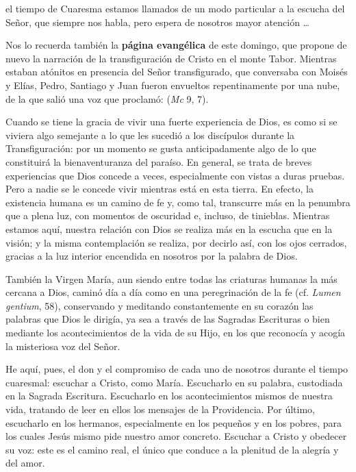 
\begin{body}
 el tiempo de Cuaresma estamos llamados de un modo particular a la escucha del Señor, que siempre nos habla, pero espera de nosotros mayor atención \ldots 

Nos lo recuerda también la \textbf{página evangélica} de este domingo, que propone de nuevo la narración de la transfiguración de Cristo en el monte Tabor. Mientras estaban atónitos en presencia del Señor transfigurado, que conversaba con Moisés y Elías, Pedro, Santiago y Juan fueron envueltos repentinamente por una nube, de la que salió una voz que proclamó:  (\textit{Mc} 9, 7). 

Cuando se tiene la gracia de vivir una fuerte experiencia de Dios, es como si se viviera algo semejante a lo que les sucedió a los discípulos durante la Transfiguración: por un momento se gusta anticipadamente algo de lo que constituirá la bienaventuranza del paraíso. En general, se trata de breves experiencias que Dios concede a veces, especialmente con vistas a duras pruebas. Pero a nadie se le concede vivir  mientras está en esta tierra. En efecto, la existencia humana es un camino de fe y, como tal, transcurre más en la penumbra que a plena luz, con momentos de oscuridad e, incluso, de tinieblas. Mientras estamos aquí, nuestra relación con Dios se realiza más en la escucha que en la visión; y la misma contemplación se realiza, por decirlo así, con los ojos cerrados, gracias a la luz interior encendida en nosotros por la palabra de Dios.

También la Virgen María, aun siendo entre todas las criaturas humanas la más cercana a Dios, caminó día a día como en una peregrinación de la fe (cf. \textit{Lumen gentium}, 58), conservando y meditando constantemente en su corazón las palabras que Dios le dirigía, ya sea a través de las Sagradas Escrituras o bien mediante los acontecimientos de la vida de su Hijo, en los que reconocía y acogía la misteriosa voz del Señor. 

He aquí, pues, el don y el compromiso de cada uno de nosotros durante el tiempo cuaresmal: escuchar a Cristo, como María. Escucharlo en su palabra, custodiada en la Sagrada Escritura. Escucharlo en los acontecimientos mismos de nuestra vida, tratando de leer en ellos los mensajes de la Providencia. Por último, escucharlo en los hermanos, especialmente en los pequeños y en los pobres, para los cuales Jesús mismo pide nuestro amor concreto. Escuchar a Cristo y obedecer su voz: este es el camino real, el único que conduce a la plenitud de la alegría y del amor.
\end{body}



